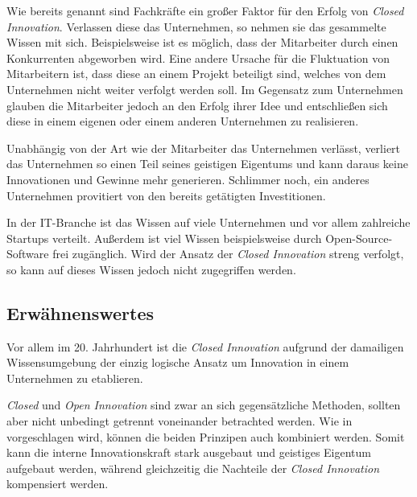 Wie bereits genannt sind Fachkräfte ein großer Faktor für den Erfolg von \textit{Closed Innovation}.
Verlassen diese das Unternehmen, so nehmen sie das gesammelte Wissen mit sich.
Beispielsweise ist es möglich, dass der Mitarbeiter durch einen Konkurrenten abgeworben wird.
Eine andere Ursache für die Fluktuation von Mitarbeitern ist,
dass diese an einem Projekt beteiligt sind,
welches von dem Unternehmen nicht weiter verfolgt werden soll.
Im Gegensatz zum Unternehmen glauben die Mitarbeiter jedoch an den Erfolg ihrer Idee
und entschließen sich diese in einem eigenen oder einem anderen Unternehmen zu realisieren.

Unabhängig von der Art wie der Mitarbeiter das Unternehmen verlässt,
verliert das Unternehmen so einen Teil seines geistigen Eigentums
und kann daraus keine Innovationen und Gewinne mehr generieren.
Schlimmer noch, ein anderes Unternehmen provitiert von den bereits getätigten Investitionen.

In der IT-Branche ist das Wissen auf viele Unternehmen und vor allem zahlreiche Startups verteilt.
Außerdem ist viel Wissen beispielsweise durch Open-Source-Software frei zugänglich.
Wird der Ansatz der \textit{Closed Innovation} streng verfolgt,
so kann auf dieses Wissen jedoch nicht zugegriffen werden.

\subsection{Erwähnenswertes}\label{sec:bewertung-erw}
Vor allem im 20. Jahrhundert ist die \textit{Closed Innovation}
aufgrund der damailigen Wissensumgebung
der einzig logische Ansatz um Innovation in einem Unternehmen zu etablieren.

\textit{Closed} und \textit{Open Innovation} sind zwar an sich gegensätzliche Methoden,
sollten aber nicht unbedingt getrennt voneinander betrachted werden.
Wie in \cite{OpenInno32:online} vorgeschlagen wird,
können die beiden Prinzipen auch kombiniert werden.
Somit kann die interne Innovationskraft stark ausgebaut und geistiges Eigentum aufgebaut werden,
während gleichzeitig die Nachteile der \textit{Closed Innovation} kompensiert werden.
